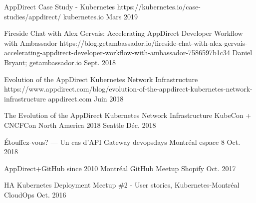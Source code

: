

\begin{cvhonors}

  \cvhonor
    {AppDirect Case Study - Kubernetes} %
    {} %
    {https://kubernetes.io/case-studies/appdirect/} %
    {kubernetes.io} %
    {Mars 2019} %

  \cvhonor
    {Fireside Chat with Alex Gervais: Accelerating AppDirect Developer Workflow with Ambassador} %
    {} %
    {https://blog.getambassador.io/fireside-chat-with-alex-gervais-accelerating-appdirect-developer-workflow-with-ambassador-7586597b1c34} %
    {Daniel Bryant; getambassador.io} %
    {Sept. 2018} %

  \cvhonor
    {Evolution of the AppDirect Kubernetes Network Infrastructure} %
    {} %
    {https://www.appdirect.com/blog/evolution-of-the-appdirect-kubernetes-network-infrastructure} %
    {appdirect.com} %
    {Juin 2018} %

\end{cvhonors}


\begin{cvhonors}

  \cvhonor
    {The Evolution of the AppDirect Kubernetes Network Infrastructure} %
    {KubeCon + CNCFCon North America 2018} %
    {} %
    {Seattle} %
    {Déc. 2018} %

  \cvhonor
    {Étouffez-vous? — Un cas d’API Gateway} %
    {devopsdays Montréal} %
    {} %
    {espace 8} %
    {Oct. 2018} %

  \cvhonor
    {AppDirect+GitHub since 2010} %
    {Montréal GitHub Meetup} %
    {} %
    {Shopify} %
    {Oct. 2017} %

  \cvhonor
    {HA Kubernetes Deployment} %
    {Meetup \#2 - User stories, Kubernetes-Montréal} %
    {} %
    {CloudOps} %
    {Oct. 2016} %

\end{cvhonors}